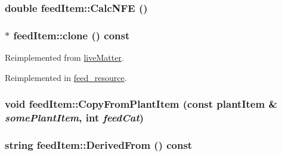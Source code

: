 \label{classfeed_item_a65b1eff694520848d90bcecad5f1c317}
\hypertarget{classfeed_item_a3ecdcc476b661f9bc22864de7ee4da56}{
\subsubsection[{CalcNFE}]{\setlength{\rightskip}{0pt plus 5cm}double feedItem::CalcNFE ()}}
\label{classfeed_item_a3ecdcc476b661f9bc22864de7ee4da56}
\hypertarget{classfeed_item_a7e3003ebb344d52fea31448657666253}{
\subsubsection[{clone}]{ $\ast$ feedItem::clone () const}}
\label{classfeed_item_a7e3003ebb344d52fea31448657666253}


Reimplemented from \hyperlink{classlive_matter_a08101ef64ee3eeec55d222bb75975370}{liveMatter}.

Reimplemented in \hyperlink{classfeed__resource_ab5b47b60feeca736e185b15a5125836a}{feed\_\-resource}.\hypertarget{classfeed_item_aaed43966abf8f097fc6245e97ecb2726}{
\subsubsection[{CopyFromPlantItem}]{\setlength{\rightskip}{0pt plus 5cm}void feedItem::CopyFromPlantItem (const {\bf plantItem} \& {\em somePlantItem}, \/  int {\em feedCat})}}
\label{classfeed_item_aaed43966abf8f097fc6245e97ecb2726}
\hypertarget{classfeed_item_a4f69deaedb7678ebab0aa8feb267ac64}{
\subsubsection[{DerivedFrom}]{\setlength{\rightskip}{0pt plus 5cm}string feedItem::DerivedFrom () const}}
\label{classfeed_item_a4f69deaedb7678ebab0aa8feb267ac64}



